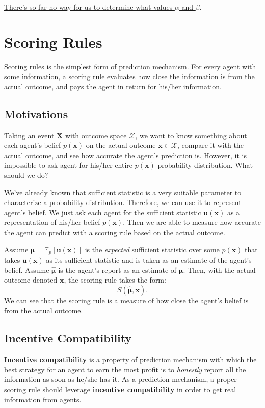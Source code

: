 \documentclass[12pt]{article}
\begin{document}
\underline{There's so far no way for us to determine what values $\alpha$ and $\beta$}.
\newpage
\section{Scoring Rules}
Scoring rules is the simplest form of prediction mechanism. For every agent with some information, a scoring rule evaluates how close the information is from the actual outcome, and pays the agent in return for his/her information.

\subsection{Motivations}
Taking an event $\mathbf{X}$ with outcome space $\mathcal{X}$, we want to know something about each agent's belief $p(\mathbf{x})$ on the actual outcome $\mathbf{x}\in \mathcal{X}$, compare it with the actual outcome, and see how accurate the agent's prediction is. However, it is impossible to ask agent for his/her entire $p(\mathbf{x})$ probability distribution. What should we do?

We've already known that sufficient statistic is a very suitable parameter to characterize a probability distribution. Therefore, we can use it to represent agent's belief. We just ask each agent for the sufficient statistic $\mathbf{u}(\mathbf{x})$ as a representation of his/her belief $p(\mathbf{x})$. Then we are able to measure how accurate the agent can predict with a scoring rule based on the actual outcome.

Assume $\bm{\mu}=\mathbb{E}_p[\mathbf{u}(\mathbf{x})]$ is the \textit{expected} sufficient statistic over some $p(\mathbf{x})$ that takes $\mathbf{u}(\mathbf{x})$ as its sufficient statistic and is taken as an estimate of the agent's belief. Assume $\bm{\hat{\mu}}$ is the agent's report as an estimate of $\bm{\mu}$. Then, with the actual outcome denoted $\mathbf{x}$, the scoring rule takes the form:
\[S(\bm{\hat{\mu}},\mathbf{x}).\]
We can see that the scoring rule is a measure of how close the agent's belief is from the actual outcome.

\subsection{Incentive Compatibility}
\textbf{Incentive compatibility} is a property of prediction mechanism with which the best strategy for an agent to earn the most profit is to \textit{honestly} report all the information as soon as he/she has it. As a prediction mechanism, a proper scoring rule should leverage \textbf{incentive compatibility} in order to get real information from agents.
\end{document}
